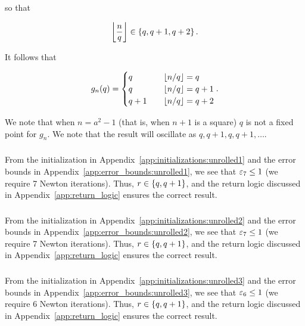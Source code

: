 \noindent
so that

\begin{equation}
    \left\lfloor \frac{n}{q} \right\rfloor\in\left\{ q, q+1, q+2 \right\}.
\end{equation}

\noindent
It follows that

\begin{equation}
    g_{n}(q) = \begin{cases}
        q &\quad \left\lfloor n/q \right\rfloor = q \\
        q &\quad \left\lfloor n/q \right\rfloor = q+1 \\
        q+1 &\quad \left\lfloor n/q \right\rfloor = q+2 \\
    \end{cases}.
\end{equation}

\noindent
We note that when $n = a^{2} - 1$ (that is, when $n+1$ is a square)
$q$ is not a fixed point for $g_{n}$.
We note that the result will oscillate as $q, q+1, q, q+1, \dots$.

\subsubsection{\UnrolledOne{}}

From the initialization in Appendix~\ref{app:initializations:unrolled1}
and the error bounds in Appendix~\ref{app:error_bounds:unrolled1},
we see that $\varepsilon_{7}\le1$ (we require 7 Newton iterations).
Thus, $r\in\left\{ q,q+1 \right\}$, and the return logic
discussed in Appendix~\ref{app:return_logic} ensures the correct result.

\subsubsection{\UnrolledTwo{}}

From the initialization in Appendix~\ref{app:initializations:unrolled2}
and the error bounds in Appendix~\ref{app:error_bounds:unrolled2},
we see that $\varepsilon_{7}\le1$ (we require 7 Newton iterations).
Thus, $r\in\left\{ q,q+1 \right\}$, and the return logic
discussed in Appendix~\ref{app:return_logic} ensures the correct result.

\subsubsection{\UnrolledThree{}}

From the initialization in Appendix~\ref{app:initializations:unrolled3}
and the error bounds in Appendix~\ref{app:error_bounds:unrolled3},
we see that $\varepsilon_{6}\le1$ (we require 6 Newton iterations).
Thus, $r\in\left\{ q,q+1 \right\}$, and the return logic
discussed in Appendix~\ref{app:return_logic} ensures the correct result.

